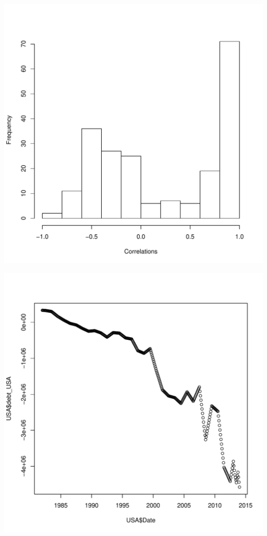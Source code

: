 \documentclass[12pt]{article}
\begin{document}
\centerline{\includegraphics{correlation.pdf}}

\centerline{\includegraphics{us_debt.pdf}}
\end{document}
